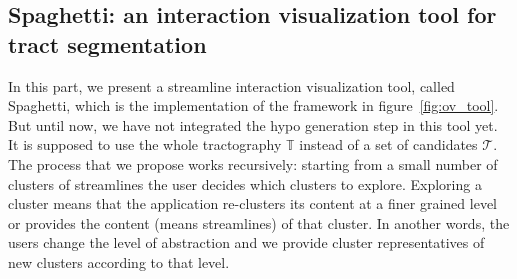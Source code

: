 \subsection{Spaghetti: an interaction visualization tool for tract segmentation}
\label{subsec:resul_spagheti}
In this part, we present a streamline interaction visualization tool, called Spaghetti, which is the implementation of the framework in figure~\ref{fig:ov_tool}. But until now, we have not integrated the hypo generation step in this tool yet. It is supposed to use the whole tractography $\mathbb{T}$ instead of a set of candidates $\mathcal{T}$.
The process that we propose works recursively: starting from a small number of clusters of streamlines the user decides which clusters to explore. Exploring a cluster means that the application re-clusters its content at a finer grained level or provides the content (means streamlines) of that cluster. In another words, the users change the level of abstraction and we provide cluster representatives of new clusters according to that level. %

